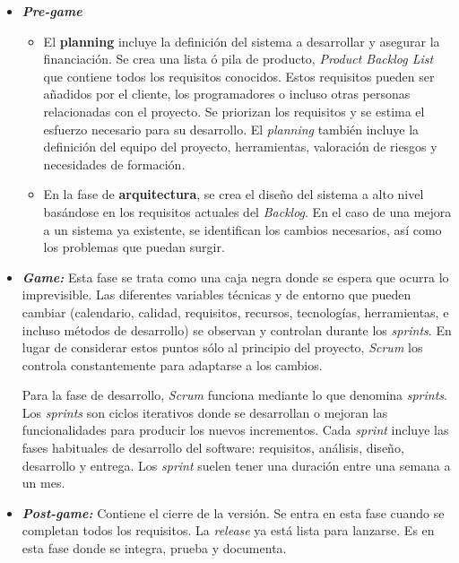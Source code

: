 \begin{itemize}
\item \textbf{\textit{Pre-game}}
  \begin{itemize} 
  \item El \textbf{\textbf{planning}} incluye la definición del sistema a desarrollar y asegurar la financiación. Se crea una lista ó pila de producto, \textit{Product Backlog List} que contiene todos los requisitos conocidos. Estos requisitos pueden ser añadidos por el cliente, los programadores o incluso otras personas relacionadas con el proyecto. Se priorizan los requisitos y se estima el esfuerzo necesario para su desarrollo. El \textit{planning} también incluye la definición del equipo del proyecto, herramientas, valoración de riesgos y necesidades de formación. 
  \item En la fase de \textbf{arquitectura}, se crea el diseño del sistema a alto nivel basándose en los requisitos actuales del \textit{Backlog}. En el caso de una mejora a un sistema ya existente, se identifican los cambios necesarios, así como los problemas que puedan surgir.
  \end{itemize}
  
\item \textbf{\textit{Game:}} Esta fase se trata como una caja negra donde se espera  que ocurra lo imprevisible. Las diferentes variables técnicas y de entorno que pueden cambiar (calendario, calidad, requisitos, recursos, tecnologías, herramientas, e incluso métodos de desarrollo) se observan y controlan durante los \textit{sprints}. En lugar de considerar estos puntos sólo al principio del proyecto, \textit{Scrum} los controla constantemente para adaptarse a los cambios.
  
  Para la fase de desarrollo, \textit{Scrum} funciona mediante lo que denomina \textit{sprints}. Los \textit{sprints} son ciclos iterativos donde se desarrollan o mejoran las funcionalidades para producir los nuevos incrementos. Cada \textit{sprint} incluye las fases habituales de desarrollo del software: requisitos, análisis, diseño, desarrollo y entrega. Los \textit{sprint} suelen tener una duración entre una semana a un mes.
  
\item\textbf{\textit{Post-game:}} Contiene el cierre de la versión. Se entra en esta fase cuando se completan todos los requisitos. La \textit{release} ya está lista para lanzarse. Es en esta fase donde se integra, prueba y documenta.
\end{itemize}

